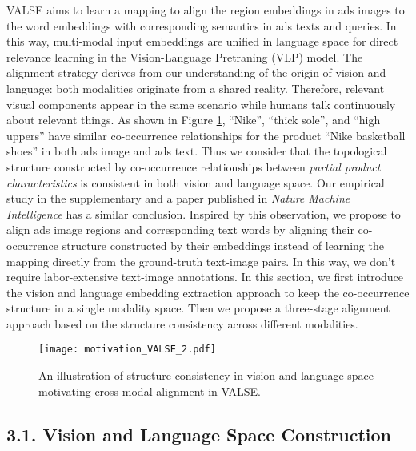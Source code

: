 \documentclass[letterpaper]{article} \usepackage{aaai24}  \usepackage{times}  \usepackage{helvet}  \usepackage{courier}  \usepackage[hyphens]{url}  \usepackage{graphicx} \urlstyle{rm} \def\UrlFont{\rm}  \usepackage{natbib}  \usepackage{caption} \frenchspacing  \setlength{\pdfpagewidth}{8.5in}  \setlength{\pdfpageheight}{11in}
\begin{document}
VALSE aims to learn a mapping to align the region embeddings in ads images to the word embeddings with corresponding semantics in ads texts and queries. In this way, multi-modal input embeddings are unified in language space for direct relevance learning in the Vision-Language Pretraning (VLP) model.  The alignment strategy derives from our understanding of the origin of vision and language: both modalities originate from a shared reality.  Therefore, relevant visual components appear in the same scenario while humans talk continuously about relevant things. As shown in Figure \ref{fig:motivation_2}, ``Nike'',  ``thick sole'', and ``high uppers''  have similar co-occurrence relationships for the product ``Nike basketball shoes'' in both ads image and ads text. Thus we consider that the topological structure constructed by co-occurrence relationships between \textit{partial product characteristics} is consistent in both vision and language space. Our empirical study in the supplementary and a paper published in \textit{Nature Machine Intelligence} \cite{roads2020learning} has a similar conclusion. Inspired by this observation, we propose to align ads image regions and corresponding text words by aligning their co-occurrence structure constructed by their embeddings instead of learning the mapping directly from the ground-truth text-image pairs. In this way, we don't require labor-extensive text-image annotations. In this section, we first introduce the vision and language embedding extraction approach to keep the co-occurrence structure in a single modality space. Then we propose a three-stage alignment approach based on the structure consistency across different modalities.

\begin{figure}[t]
\centering
    \texttt{[image: motivation\_VALSE\_2.pdf]}
    \caption{An illustration of structure consistency in vision and language space motivating cross-modal alignment in VALSE. 
    } 
\label{fig:motivation_2}
\end{figure}

\subsection{3.1. Vision and Language Space Construction}
\label{ssec:space construction}
\end{document}
